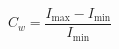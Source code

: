 \documentclass[../main.tex]{subfiles}%
\begin{document}
%
    \Xequation%
    \begin{equation}%
        C_w = \dfrac{I_\textrm{max}-I_\textrm{min}}{I_\textrm{min}}%
        \label{eq:contrast-weber}%
    \end{equation}%
\end{document}
